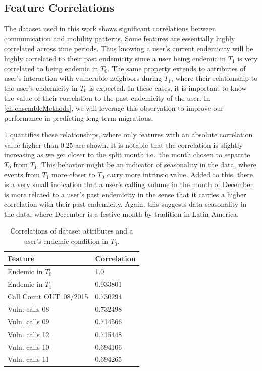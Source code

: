 \subsection{Feature Correlations}
\label{subsection:feature_correlations} %


The dataset used in this work shows significant correlations between communication and mobility patterns.
Some features are essentially highly correlated across time periods.
Thus knowing a user's current endemicity will be highly correlated to their past endemicity since a user being endemic in $T_1$ is very correlated to being endemic in $T_0$.
The same property extends to attributes of user's interaction with vulnerable neighbors during $T_1$, where their relationship to the user's endemicity in $T_0$ is expected.
In these cases, it is important to know the value of their correlation to the past endemicity of the user.
In \cref{ch:ensembleMethods}, we will leverage this observation to improve our performance in predicting long-term migrations.

\cref{tab:featureCorrelations} quantifies these relationships, where only features with an absolute correlation value higher than $0.25$ are shown.
It is notable that the correlation is slightly increasing as we get closer to the split month i.e.\ the month chosen to separate $T_0$ from $T_1$.
This behavior might be an indicator of seasonality in the data, where events from $T_1$ more closer to $T_0$ carry more intrinsic value.
Added to this, there is a very small indication that a user's calling volume in the month of December is more related to a user's past endemicity in the sense that it carries a higher correlation with their past endemicity.
Again, this suggests data seasonality in the data, where December is a festive month by tradition in Latin America.


\begin{table}
	\caption{Correlations of dataset attributes and a user's endemic condition in $T_0$.}
	\label{tab:featureCorrelations}
	\centering
	\begin{tabular}{l l }
		\toprule
		Feature & Correlation \\
		\midrule
		Endemic in $T_0$        & 1.0 \\
		Endemic in $T_1$        & 0.933801 \\
		Call Count  OUT\ 08/2015  & 0.730294 \\
		Vuln. calls  08 &0.732498 \\
		Vuln. calls  09   &0.714566 \\
		Vuln. calls 12  &0.715448 \\
		Vuln. calls  10  &0.694106 \\
		Vuln. calls  11   &0.694265 \\
		\bottomrule
	\end{tabular}
\end{table}


